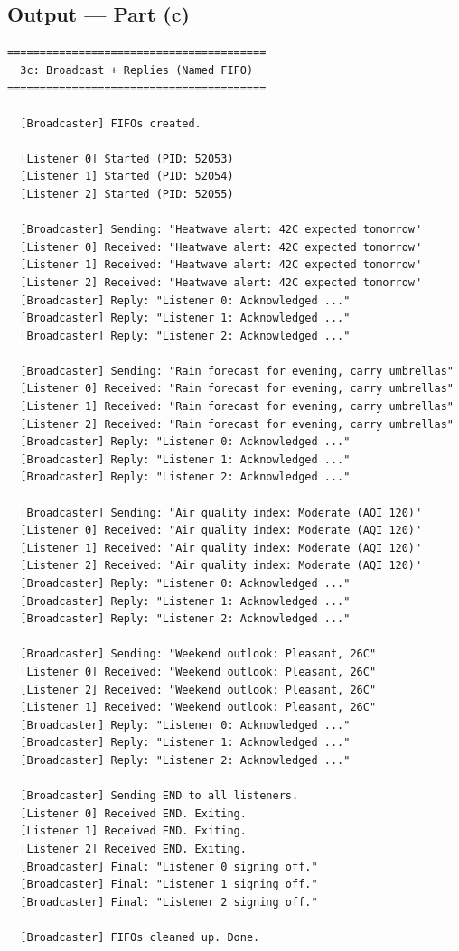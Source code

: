 \documentclass[11pt,a4paper]{article}
\begin{document}
\subsection*{Output --- Part (c)}
\begin{outputbox}
\begin{lstlisting}[style=outputstyle]
========================================
  3c: Broadcast + Replies (Named FIFO)
========================================

  [Broadcaster] FIFOs created.

  [Listener 0] Started (PID: 52053)
  [Listener 1] Started (PID: 52054)
  [Listener 2] Started (PID: 52055)

  [Broadcaster] Sending: "Heatwave alert: 42C expected tomorrow"
  [Listener 0] Received: "Heatwave alert: 42C expected tomorrow"
  [Listener 1] Received: "Heatwave alert: 42C expected tomorrow"
  [Listener 2] Received: "Heatwave alert: 42C expected tomorrow"
  [Broadcaster] Reply: "Listener 0: Acknowledged ..."
  [Broadcaster] Reply: "Listener 1: Acknowledged ..."
  [Broadcaster] Reply: "Listener 2: Acknowledged ..."

  [Broadcaster] Sending: "Rain forecast for evening, carry umbrellas"
  [Listener 0] Received: "Rain forecast for evening, carry umbrellas"
  [Listener 1] Received: "Rain forecast for evening, carry umbrellas"
  [Listener 2] Received: "Rain forecast for evening, carry umbrellas"
  [Broadcaster] Reply: "Listener 0: Acknowledged ..."
  [Broadcaster] Reply: "Listener 1: Acknowledged ..."
  [Broadcaster] Reply: "Listener 2: Acknowledged ..."

  [Broadcaster] Sending: "Air quality index: Moderate (AQI 120)"
  [Listener 0] Received: "Air quality index: Moderate (AQI 120)"
  [Listener 1] Received: "Air quality index: Moderate (AQI 120)"
  [Listener 2] Received: "Air quality index: Moderate (AQI 120)"
  [Broadcaster] Reply: "Listener 0: Acknowledged ..."
  [Broadcaster] Reply: "Listener 1: Acknowledged ..."
  [Broadcaster] Reply: "Listener 2: Acknowledged ..."

  [Broadcaster] Sending: "Weekend outlook: Pleasant, 26C"
  [Listener 0] Received: "Weekend outlook: Pleasant, 26C"
  [Listener 2] Received: "Weekend outlook: Pleasant, 26C"
  [Listener 1] Received: "Weekend outlook: Pleasant, 26C"
  [Broadcaster] Reply: "Listener 0: Acknowledged ..."
  [Broadcaster] Reply: "Listener 1: Acknowledged ..."
  [Broadcaster] Reply: "Listener 2: Acknowledged ..."

  [Broadcaster] Sending END to all listeners.
  [Listener 0] Received END. Exiting.
  [Listener 1] Received END. Exiting.
  [Listener 2] Received END. Exiting.
  [Broadcaster] Final: "Listener 0 signing off."
  [Broadcaster] Final: "Listener 1 signing off."
  [Broadcaster] Final: "Listener 2 signing off."

  [Broadcaster] FIFOs cleaned up. Done.
\end{lstlisting}
\end{outputbox}
\end{document}
